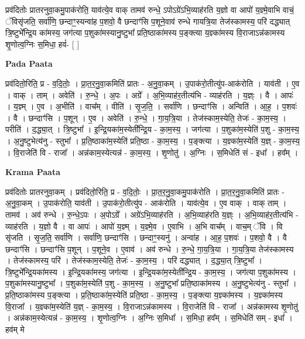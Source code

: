 \documentclass[17pt]{extarticle}
\begin{document}
प्रव॑दितोः प्रातरनुवा॒कमु॒पाक॑रोति॒ याव॑त्ये॒व वाक् तामव॑ रुन्धे॒ ऽपोऽग्रे॑ऽभि॒व्याह॑रति य॒ज्ञो वा आपो॑ य॒ज्ञ्मे॒वाभि वाचं॒ ॅविसृ॑जति॒ सर्वा॑णि॒ छन्दाꣳ॒॒स्यन्वा॑ह प॒शवो॒ वै छन्दाꣳ॑सि प॒शूने॒वाव॑ रुन्धे गायत्रि॒या तेज॑स्कामस्य॒ परि॑ दद्ध्यात् त्रि॒ष्टुभे᳚न्द्रि॒य का॑मस्य॒ जग॑त्या प॒शुका॑मस्यानु॒ष्टुभा᳚ प्रति॒ष्ठाका॑मस्य प॒ङ्क्त्या य॒ज्ञ्का॑मस्य वि॒राजाऽन्न॑कामस्य शृ॒णोत्व॒ग्निः स॒मिधा॒ हवं॑- [  ] \newline

\textbf{Pada Paata} \newline

प्रव॑दितो॒रिति॒ प्र - व॒दि॒तोः॒ । प्रा॒त॒र॒नु॒वा॒कमिति॑ प्रातः - अ॒नु॒वा॒कम् । उ॒पाक॑रो॒तीत्यु॑प-आक॑रोति । याव॑ती । ए॒व । वाक् । ताम् । अवेति॑ । रु॒न्धे॒ । अ॒पः । अग्रे᳚ । अ॒भि॒व्याह॑र॒तीत्य॑भि - व्याह॑रति । य॒ज्ञ्ः । वै । आपः॑ । य॒ज्ञ्म् । ए॒व । अ॒भीति॑ । वाच᳚म् । वीति॑ । सृ॒ज॒ति॒ । सर्वा॑णि । छन्दाꣳ॑सि । अन्विति॑ । आ॒ह॒ । प॒शवः॑ । वै । छन्दाꣳ॑सि । प॒शून् । ए॒व । अवेति॑ । रु॒न्धे॒ । गा॒य॒त्रि॒या । तेज॑स्काम॒स्येति॒ तेजः॑ - का॒म॒स्य॒ । परीति॑ । द॒द्ध्या॒त् । त्रि॒ष्टुभा᳚ । इ॒न्द्रि॒यका॑म॒स्येती᳚न्द्रि॒य - का॒म॒स्य॒ । जग॑त्या । प॒शुका॑म॒स्येति॑ प॒शु - का॒म॒स्य॒ । अ॒नु॒ष्टुभेत्य॑नु - स्तुभा᳚ । प्र॒ति॒ष्ठाका॑म॒स्येति॑ प्रति॒ष्ठा - का॒म॒स्य॒ । प॒ङ्क्त्या । य॒ज्ञ्का॑म॒स्येति॑ य॒ज्ञ् - का॒म॒स्य॒ । वि॒राजेति॑ वि - राजा᳚ । अन्न॑काम॒स्येत्यन्न॑ - का॒म॒स्य॒ । शृ॒णोतु॑ । अ॒ग्निः । स॒मिधेति॑ सं - इधा᳚ । हव᳚म् ।  \newline


\textbf{Krama Paata} \newline

प्रव॑दितोः प्रातरनुवा॒कम् । प्रव॑दितो॒रिति॒ प्र - व॒दि॒तोः॒ । प्रा॒त॒र॒नु॒वा॒कमु॒पाक॑रोति । प्रा॒त॒र॒नु॒वा॒कमिति॑ प्रातः - अ॒नु॒वा॒कम् । उ॒पाक॑रोति॒ याव॑ती । उ॒पाक॑रो॒तीत्यु॑प - आक॑रोति । याव॑त्ये॒व । ए॒व वाक् । वाक् ताम् । तामव॑ । अव॑ रुन्धे । रु॒न्धे॒ऽपः । अ॒पोऽग्रे᳚ । अग्रे॑ऽभि॒व्याह॑रति । अ॒भि॒व्याह॑रति य॒ज्ञ्ः । अ॒भि॒व्याह॑र॒तीत्य॑भि - व्याह॑रति । य॒ज्ञो वै । वा आपः॑ । आपो॑ य॒ज्ञ्म् । य॒ज्ञ्मे॒व । ए॒वाभि । अ॒भि वाच᳚म् । वाच॒म् ॅवि । वि सृ॑जति । सृ॒ज॒ति॒ सर्वा॑णि । सर्वा॑णि॒ छन्दाꣳ॑सि । छन्दाꣳ॒॒स्यनु॑ । अन्वा॑ह । आ॒ह॒ प॒शवः॑ । प॒शवो॒ वै । वै छन्दाꣳ॑सि । छन्दाꣳ॑सि प॒शून् । प॒शूने॒व । ए॒वाव॑ । अव॑ रुन्धे । रु॒न्धे॒ गा॒य॒त्रि॒या । गा॒य॒त्रि॒या तेज॑स्कामस्य । तेज॑स्कामस्य॒ परि॑ । तेज॑स्काम॒स्येति॒ तेजः॑ - का॒म॒स्य॒ । परि॑ दद्ध्यात् । द॒द्ध्या॒त् त्रि॒ष्टुभा᳚ । त्रि॒ष्टुभे᳚न्द्रि॒यका॑मस्य । इ॒न्द्रि॒यका॑मस्य॒ जग॑त्या । इ॒न्द्रि॒यका॑म॒स्येती᳚न्द्रि॒य - का॒म॒स्य॒ । जग॑त्या प॒शुका॑मस्य । प॒शुका॑मस्यानु॒ष्टुभा᳚ । प॒शुका॑म॒स्येति॑ प॒शु - का॒म॒स्य॒ । अ॒नु॒ष्टुभा᳚ प्रति॒ष्ठाका॑मस्य । अ॒नु॒ष्टुभेत्य॑नु - स्तुभा᳚ । प्र॒ति॒ष्ठाका॑मस्य प॒ङ्‍क्त्या । प्र॒ति॒ष्ठाका॑म॒स्येति॑ प्रति॒ष्ठा - का॒म॒स्य॒ । प॒ङ्‍क्त्या य॒ज्ञ्का॑मस्य । य॒ज्ञ्का॑मस्य वि॒राजा᳚ । य॒ज्ञ्का॑म॒स्येति॑ य॒ज्ञ् - का॒म॒स्य॒ । वि॒राजाऽन्न॑कामस्य । वि॒राजेति॑ वि - राजा᳚ । अन्न॑कामस्य शृ॒णोतु॑ । अन्न॑काम॒स्येत्यन्न॑ - का॒म॒स्य॒ । शृ॒णोत्व॒ग्निः । अ॒ग्निः स॒मिधा᳚ । स॒मिधा॒ हव᳚म् । स॒मिधेति॑ सम् - इधा᳚ । हव॑म् मे \newline
\end{document}
